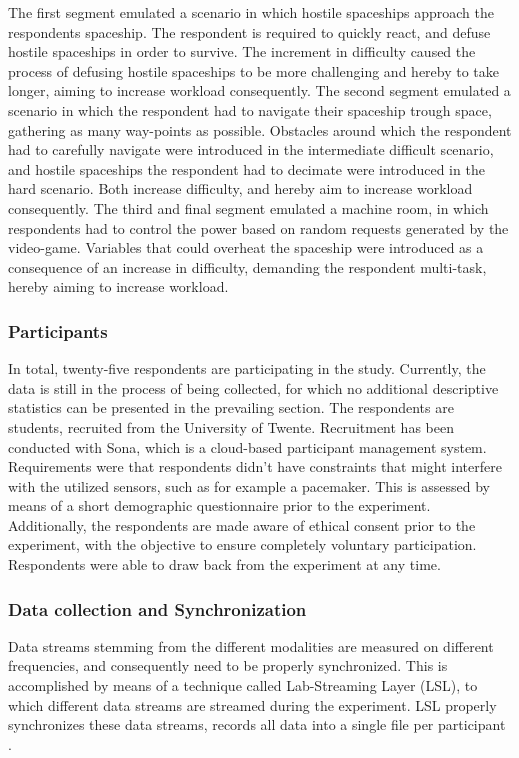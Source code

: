 \documentclass{article}
\begin{document}
\egroup

The first segment emulated a scenario in which hostile spaceships approach the respondents spaceship. The respondent is required to  quickly react, and defuse hostile spaceships in order to survive. The increment in difficulty caused the process of defusing hostile spaceships to be more challenging and hereby to take longer,  aiming to increase workload consequently. The second segment emulated a scenario in which the respondent had to navigate their spaceship trough space, gathering as many way-points as possible. Obstacles around which the respondent had to carefully navigate were introduced in the intermediate difficult scenario, and hostile spaceships the respondent had to decimate were introduced in the hard scenario. Both increase difficulty, and hereby aim to increase workload consequently. The third and final segment emulated a machine room, in which respondents had to control the power based on random requests generated by the video-game. Variables that could overheat the spaceship  were introduced as a consequence of an increase in difficulty, demanding the respondent multi-task, hereby aiming to increase workload. 

\subsubsection{Participants}
In total, twenty-five respondents are participating in the study. Currently, the data is still in the process of being collected, for which no additional descriptive statistics can be presented in the prevailing section. The respondents are students, recruited from the University of Twente. Recruitment has been conducted with Sona, which is a cloud-based participant management system. Requirements were that respondents didn't have constraints that might interfere with the utilized sensors, such as for example a pacemaker. This is assessed by means of a short demographic questionnaire prior to the experiment. Additionally, the respondents are made aware of ethical consent prior to the experiment, with the objective to ensure completely voluntary participation. Respondents were able to draw back from the experiment at any time. 

\subsubsection{Data collection and Synchronization}
Data streams stemming from the different modalities are measured on different frequencies, and consequently need to be properly synchronized. This is accomplished by means of a technique called Lab-Streaming Layer (LSL), to which different data streams are streamed during the experiment. LSL properly synchronizes these data streams, records all data into a single file per participant \cite{kothe2018lab}.
\end{document}
